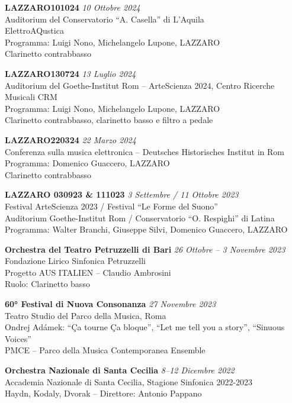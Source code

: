 \documentclass[11pt,a4paper]{article}
\newcommand{\cvevent}[3]{%
    \textbf{#1} \hfill \textit{#2}\\
    #3\vspace{0.3em}
}
\begin{document}
\cvevent{LAZZARO101024}{10 Ottobre 2024}
{Auditorium del Conservatorio ``A. Casella'' di L'Aquila\\
ElettroAQustica\\
Programma: Luigi Nono, Michelangelo Lupone, LAZZARO\\
Clarinetto contrabbasso}

\cvevent{LAZZARO130724}{13 Luglio 2024}
{Auditorium del Goethe-Institut Rom -- ArteScienza 2024, Centro Ricerche Musicali CRM\\
Programma: Luigi Nono, Michelangelo Lupone, LAZZARO\\
Clarinetto contrabbasso, clarinetto basso e filtro a pedale}

\cvevent{LAZZARO220324}{22 Marzo 2024}
{Conferenza sulla musica elettronica -- Deutsches Historisches Institut in Rom\\
Programma: Domenico Guaccero, LAZZARO\\
Clarinetto contrabbasso}


\cvevent{LAZZARO 030923 \& 111023}{3 Settembre / 11 Ottobre 2023}
{Festival ArteScienza 2023 / Festival ``Le Forme del Suono''\\
Auditorium Goethe-Institut Rom / Conservatorio ``O. Respighi'' di Latina\\
Programma: Walter Branchi, Giuseppe Silvi, Domenico Guaccero, LAZZARO}


\cvevent{Orchestra del Teatro Petruzzelli di Bari}{26 Ottobre -- 3 Novembre 2023}
{Fondazione Lirico Sinfonica Petruzzelli\\
Progetto AUS ITALIEN -- Claudio Ambrosini\\
Ruolo: Clarinetto basso}

\cvevent{60° Festival di Nuova Consonanza}{27 Novembre 2023}
{Teatro Studio del Parco della Musica, Roma\\
Ondrej Adámek: ``Ça tourne Ça bloque'', ``Let me tell you a story'', ``Sinuous Voices''\\
PMCE -- Parco della Musica Contemporanea Ensemble}


\cvevent{Orchestra Nazionale di Santa Cecilia}{8--12 Dicembre 2022}
{Accademia Nazionale di Santa Cecilia, Stagione Sinfonica 2022-2023\\
Haydn, Kodaly, Dvorak -- Direttore: Antonio Pappano}
\end{document}
